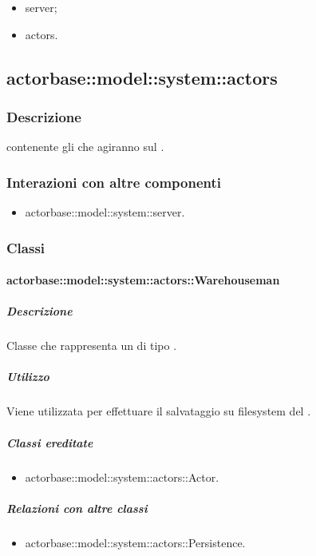 \documentclass{scalatekids-article}
\begin{document}
\begin{itemize}
\item server;
\item actors.
\end{itemize}

\subsection{actorbase::model::system::actors}

\subsubsection{Descrizione}

 contenente gli  che agiranno sul .

\subsubsection{Interazioni con altre componenti}

\begin{itemize}
\item actorbase::model::system::server.
\end{itemize}

\subsubsection{Classi}

\paragraph{actorbase::model::system::actors::Warehouseman}

\subparagraph{Descrizione}

Classe che rappresenta un  di tipo .

\subparagraph{Utilizzo}

Viene utilizzata per effettuare il salvataggio su filesystem del .

\subparagraph{Classi ereditate}

\begin{itemize}
\item actorbase::model::system::actors::Actor.
\end{itemize}

\subparagraph{Relazioni con altre classi}

\begin{itemize}
\item actorbase::model::system::actors::Persistence.
\end{itemize}
\end{document}
